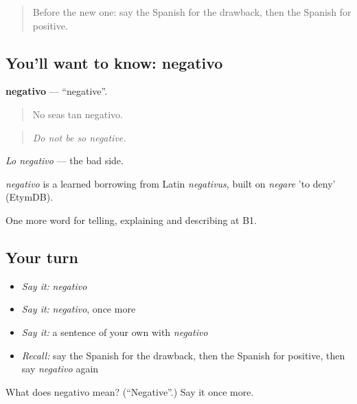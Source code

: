 \begin{quote}
Before the new one: say the Spanish for the drawback, then the Spanish for positive.
\end{quote}

\subsection*{You'll want to know: negativo}
\textbf{negativo} — \textquotedblleft{}negative\textquotedblright{}.

\begin{quote}
No seas tan negativo.
\end{quote}

\begin{quote}
\emph{Do not be so negative.}
\end{quote}

\emph{Lo negativo} — the bad side.

\begin{cousinweb}
\emph{negativo} is a learned borrowing from Latin \emph{negativus}, built on \emph{negare} 'to deny' (EtymDB).
\end{cousinweb}

\begin{grammarlens}[title={What you've built}]
One more word for telling, explaining and describing at B1.
\end{grammarlens}

\subsection*{Your turn}
\begin{itemize}
\raggedright
  \item \emph{Say it:} \emph{negativo}
  \item \emph{Say it:} \emph{negativo}, once more
  \item \emph{Say it:} a sentence of your own with \emph{negativo}
  \item \emph{Recall:} say the Spanish for the drawback, then the Spanish for positive, then say \emph{negativo} again
\end{itemize}

\begin{tcolorbox}[breakable,colback=teal!4,colframe=teal!35!black,title={Before you move on}]
What does negativo mean? (\textquotedblleft{}Negative\textquotedblright{}.) Say it once more.
\end{tcolorbox}
